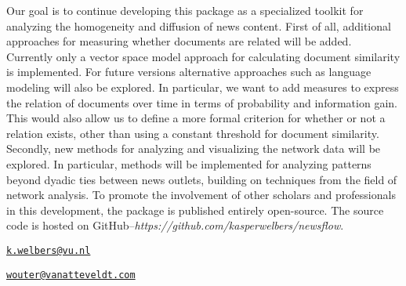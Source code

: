 Our goal is to continue developing this package as a specialized toolkit
for analyzing the homogeneity and diffusion of news content. First of
all, additional approaches for measuring whether documents are related
will be added. Currently only a vector space model approach for
calculating document similarity is implemented. For future versions
alternative approaches such as language modeling will also be explored.
In particular, we want to add measures to express the relation of
documents over time in terms of probability and information gain. This
would also allow us to define a more formal criterion for whether or not
a relation exists, other than using a constant threshold for document
similarity. Secondly, new methods for analyzing and visualizing the
network data will be explored. In particular, methods will be
implemented for analyzing patterns beyond dyadic ties between news
outlets, building on techniques from the field of network analysis. To
promote the involvement of other scholars and professionals in this
development, the package is published entirely open-source. The source
code is hosted on
GitHub--\emph{https://github.com/kasperwelbers/newsflow}.



\address{
Kasper Welbers\\
VU University Amsterdam\\
De Boelelaan 1081,\\ 1081 HV Amsterdam, The Netherlands\\
}
\href{mailto:k.welbers@vu.nl}{\nolinkurl{k.welbers@vu.nl}}

\address{
Wouter van Atteveldt\\
VU University Amsterdam\\
De Boelelaan 1081,\\ 1081 HV Amsterdam, The Netherlands\\
}
\href{mailto:wouter@vanatteveldt.com}{\nolinkurl{wouter@vanatteveldt.com}}

